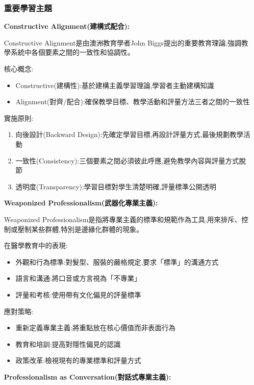 \documentclass[12pt,a4paper]{article}
\begin{document}
\subsubsection{重要學習主題}

\textbf{Constructive Alignment(建構式配合):}

Constructive Alignment是由澳洲教育學者John Biggs提出的重要教育理論,強調教學系統中各個要素之間的一致性和協調性。

核心概念:
\begin{itemize}[nosep]
    \item Constructive(建構性):基於建構主義學習理論,學習者主動建構知識
    \item Alignment(對齊/配合):確保教學目標、教學活動和評量方法三者之間的一致性
\end{itemize}

實施原則:
\begin{enumerate}
    \item 向後設計(Backward Design):先確定學習目標,再設計評量方式,最後規劃教學活動
    \item 一致性(Consistency):三個要素之間必須彼此呼應,避免教學內容與評量方式脫節
    \item 透明度(Transparency):學習目標對學生清楚明確,評量標準公開透明
\end{enumerate}

\textbf{Weaponized Professionalism(武器化專業主義):}

Weaponized Professionalism是指將專業主義的標準和規範作為工具,用來排斥、控制或壓制某些群體,特別是邊緣化群體的現象。

在醫學教育中的表現:
\begin{itemize}[nosep]
    \item 外觀和行為標準:對髮型、服裝的嚴格規定,要求「標準」的溝通方式
    \item 語言和溝通:將口音或方言視為「不專業」
    \item 評量和考核:使用帶有文化偏見的評量標準
\end{itemize}

應對策略:
\begin{itemize}[nosep]
    \item 重新定義專業主義:將重點放在核心價值而非表面行為
    \item 教育和培訓:提高對隱性偏見的認識
    \item 政策改革:檢視現有的專業標準和評量方式
\end{itemize}

\textbf{Professionalism as Conversation(對話式專業主義):}
\end{document}
